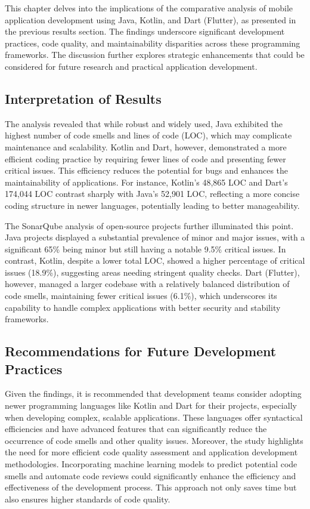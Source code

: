 This chapter delves into the implications of the comparative analysis of mobile application development using Java, Kotlin, and Dart (Flutter), as presented in the previous results section. The findings underscore significant development practices, code quality, and maintainability disparities across these programming frameworks. The discussion further explores strategic enhancements that could be considered for future research and practical application development.
\subsection{Interpretation of Results}
The analysis revealed that while robust and widely used, Java exhibited the highest number of code smells and lines of code (LOC), which may complicate maintenance and scalability. Kotlin and Dart, however, demonstrated a more efficient coding practice by requiring fewer lines of code and presenting fewer critical issues. This efficiency reduces the potential for bugs and enhances the maintainability of applications. For instance, Kotlin's 48,865 LOC and Dart's 174,044 LOC contrast sharply with Java's 52,901 LOC, reflecting a more concise coding structure in newer languages, potentially leading to better manageability.
\par
The SonarQube analysis of open-source projects further illuminated this point. Java projects displayed a substantial prevalence of minor and major issues, with a significant 65\% being minor but still having a notable 9.5\% critical issues. In contrast, Kotlin, despite a lower total LOC, showed a higher percentage of critical issues (18.9\%), suggesting areas needing stringent quality checks. Dart (Flutter), however, managed a larger codebase with a relatively balanced distribution of code smells, maintaining fewer critical issues (6.1\%), which underscores its capability to handle complex applications with better security and stability frameworks.
\subsection{Recommendations for Future Development Practices}
Given the findings, it is recommended that development teams consider adopting newer programming languages like Kotlin and Dart for their projects, especially when developing complex, scalable applications. These languages offer syntactical efficiencies and have advanced features that can significantly reduce the occurrence of code smells and other quality issues.
Moreover, the study highlights the need for more efficient code quality assessment and application development methodologies. Incorporating machine learning models to predict potential code smells and automate code reviews could significantly enhance the efficiency and effectiveness of the development process. This approach not only saves time but also ensures higher standards of code quality.

